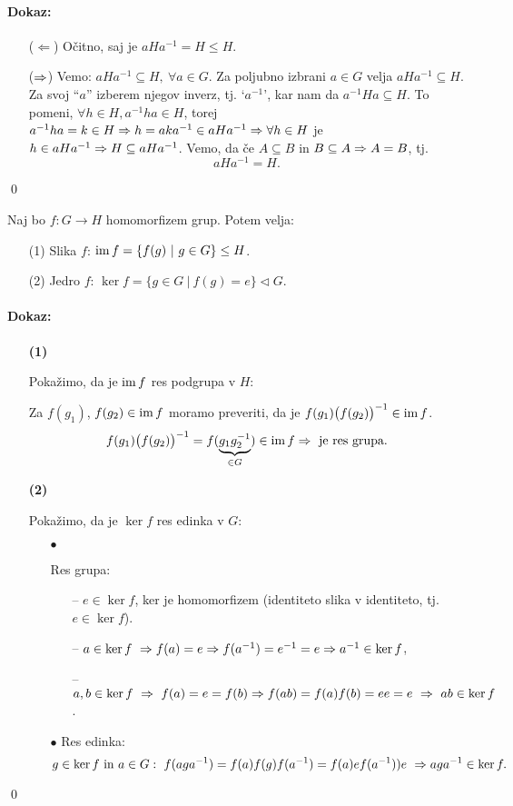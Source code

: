 \paragraph{Dokaz:}
\begin{itemize}
	\item[($\Leftarrow$)]{O\v citno, saj je $a H a^{-1} = H \leq H$.}
	\item[($\Rightarrow$)]{Vemo: $aHa^{-1} \subseteq H,\ \forall a \in G$. Za poljubno izbrani $a \in G$ velja $aHa^{-1} \subseteq H$. Za
		svoj "`$a$"' izberem njegov inverz, tj. `$a^{-1}$', kar nam da $a^{-1}Ha \subseteq H$. To pomeni, $\forall h \in H, a^{-1} h a \in H$,
		torej $a^{-1} h a = k \in H \Rightarrow h = aka^{-1} \in a H a^{-1} \Rightarrow \forall h \in H$ je $h \in aHa^{-1} \Rightarrow H\subseteq a H a^{-1}$.
		Vemo, da \v ce $A \subseteq B$ in $B \subseteq A \Rightarrow A = B$, tj.
		\[
			a H a^{-1} = H.
		\]}
\end{itemize}
\qed

\pagebreak
\begin{trditev}
	Naj bo $f : G \to H$ homomorfizem grup. Potem velja:
	\begin{itemize}
		\item[(1)]{Slika $f$: $\operatorname{im} f = \{ f(g)\ |\ g\in G\} \leq H$.}
		\item[(2)]{Jedro $f$: $\ker f = \{ g \in G\ |\ f(g) = e\} \lhd G$.}
	\end{itemize}
\end{trditev}

\paragraph{Dokaz:}
\begin{itemize}
	\item[{\bf (1)}]{Poka\v zimo, da je $\operatorname{im} f$ res podgrupa v $H$:

		Za $f(g_1)$, $f(g_2) \in \operatorname{im} f$ moramo preveriti, da je $f(g_1) \big(f(g_2)\big)^{-1} \in \operatorname{im} f$.
	\[
		f(g_1) \big(f(g_2)\big)^{-1} = f (\underbrace{g_1 g_2^{-1}}_{\in G}) \in \operatorname{im} f \Rightarrow\ \text{je res grupa.}
	\]}
	\item[{\bf (2)}]{Poka\v zimo, da je $\ker f$ res edinka v $G$:
		\begin{itemize}
			\item[$\bullet$]{Res grupa:
			\begin{itemize}
				\item[--]{$e \in \ker f$, ker je homomorfizem (identiteto slika v identiteto, tj. $e \in \ker f$).}
				\item[--]{$a \in \ker f\ \Rightarrow f(a) = e \Rightarrow f(a^{-1}) = e^{-1} = e \Rightarrow a^{-1} \in \ker f$,}
				\item[--]{$a,b \in \ker f\ \Rightarrow\ f(a) = e = f (b) \Rightarrow f(ab) = f(a) f(b) = ee = e\ \Rightarrow\ ab \in \ker f$.}
			\end{itemize}}
			\item[$\bullet$]{Res edinka:
				\[
					g\in \ker f\ \text{in}\ a \in G:\ f(aga^{-1}) = f(a) f(g) f(a^{-1}) = f(a) e f(a^{-1}) ) e\ \Rightarrow aga^{-1} \in \ker f.
				\]}
		\end{itemize}
		}
\end{itemize}
\qed

